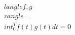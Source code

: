 \documentclass[preview]{standalone}
\begin{document}
\begin{align*}
\quad\\langle f, g \quad\\rangle = \quad\\int_0^T f(t)g(t) dt = 0
\end{align*}
\end{document}
